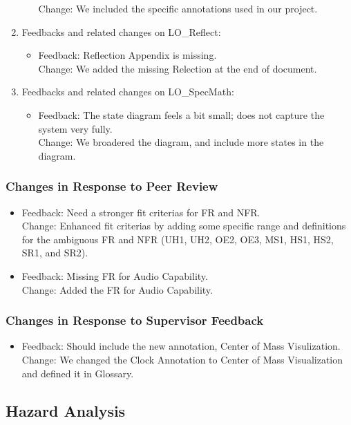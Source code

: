 \documentclass{article}
\begin{document}
\begin{enumerate}
\begin{itemize}
                Change: We included the specific annotations used in our project.
    \end{itemize}
    \item Feedbacks and related changes on LO\_Reflect:
    \begin{itemize}
        \item Feedback: Reflection Appendix is missing.\\
                Change: We added the missing Relection at the end of document.
    \end{itemize}
    \item Feedbacks and related changes on LO\_SpecMath:
    \begin{itemize}
        \item Feedback: The state diagram feels a bit small; does not capture the system very fully.\\
                Change: We broadered the diagram, and include more states in the diagram.
    \end{itemize}
\end{enumerate}
\subsubsection{Changes in Response to Peer Review}
\begin{itemize}
        \item Feedback: Need a stronger fit criterias for FR and NFR.\\
                Change: Enhanced fit criterias by adding some specific range and definitions for the ambiguous FR and NFR 
                (UH1, UH2, OE2, OE3, MS1, HS1, HS2, SR1, and SR2).
        \item Feedback: Missing FR for Audio Capability.\\
                Change: Added the FR for Audio Capability.
\end{itemize}
\subsubsection{Changes in Response to Supervisor Feedback}
\begin{itemize}
        \item Feedback: Should include the new annotation, Center of Mass Visulization.\\
                Change: We changed the Clock Annotation to Center of Mass Visualization and defined it in Glossary.
\end{itemize}
\subsection{Hazard Analysis}
\end{document}
